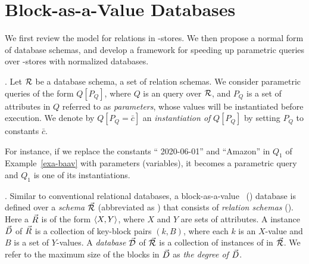 \vspace{2ex}
\section{Block-as-a-Value Databases}
\label{sec-schema}


We first review the \baav model for relations in \kv-stores. We
then propose a normal form of \baav database schemas, and develop a
framework for speeding up parametric queries over \kv-stores with
normalized \baav databases.


.
Let ${\mathcal R}$ be a database schema, \ie a set of relation schemas.  
We consider parametric queries of the form $Q[P_{Q}]$, where
$Q$ is an \SQL query over ${\mathcal R}$, and $P_{Q}$ is a set of
attributes in $Q$ referred to as {\em parameters}, whose values will
be instantiated before %
execution.
We denote by $Q[P_{Q} = \bar  c]$
an {\em instantiation of} $Q[P_{Q}]$
  by setting $P_{Q}$ to constants $\bar c$.

\vspace{0.6ex}
For instance, if we replace the constants ``{\normalsize
2020-06-01}'' and ``{\normalsize Amazon}'' in $Q_{1}$ of
  Example~\ref{exa-baav} with parameters (variables),
  it becomes a
parametric query and $Q_{1}$ is one of its instantiations.


. Similar to conventional relational
databases, a block-as-a-value~\cite{VLDB19} (\baav) database is
defined over a {\em \baav schema} $\vec{{\mathcal R}}$ (abbreviated
as \bds) that consists of {\em \baav relation schemas}
(\bss). Here a \bs $\vec{R}$ is of the form $\langle X,\allowbreak Y\rangle$,
where $X$ and $Y$ are sets of attributes. A \baav instance
$\vec{D}$ of $\vec{R}$ is a collection of key-block pairs $(k, B)$,
where each $k$ is an $X$-value and $B$ is a set of $Y$-values.
A {\em \baav database} $\vec{\mathcal D}$ of \bds $\vec{{\mathcal R}}$ is a
collection of \baav instances of \bss in $\vec{{\mathcal R}}$.
We refer to
the maximum size of the blocks in $\vec{D}$ as {\em the degree
of $\vec{D}$}.


